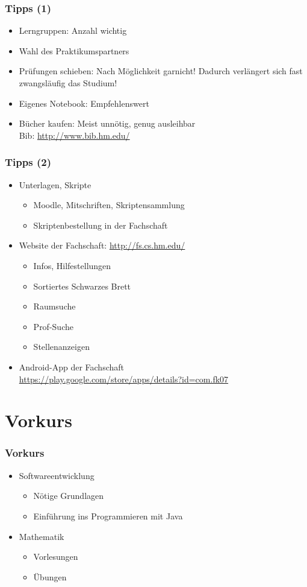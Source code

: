 \documentclass{beamer}
\begin{document}
\begin{frame}
\frametitle{Tipps (1)}
\begin{itemize}
	\item Lerngruppen: Anzahl wichtig
	\pause
	\item Wahl des Praktikumspartners
	\pause
	\item Prüfungen schieben: Nach Möglichkeit garnicht! Dadurch verlängert sich fast zwangsläufig das Studium!
	\pause
	\item Eigenes Notebook: Empfehlenswert
	\pause
	\item Bücher kaufen: Meist unnötig, genug ausleihbar\\
		\footnotesize Bib: \url{http://www.bib.hm.edu/}\small
\end{itemize}
\end{frame}


\begin{frame}
\frametitle{Tipps (2)}
\begin{itemize}
	\item Unterlagen, Skripte
		\begin{itemize}
			\item Moodle, Mitschriften, Skriptensammlung
			\item Skriptenbestellung in der Fachschaft
		\end{itemize}
	\pause
	\item Website der Fachschaft: \scriptsize\url{http://fs.cs.hm.edu/}\normalsize
		\begin{itemize}
			\item Infos, Hilfestellungen
			\item Sortiertes Schwarzes Brett
			\item Raumsuche
			\item Prof-Suche
			\item Stellenanzeigen
		\end{itemize}
	\pause
	\item Android-App der Fachschaft\\
		\scriptsize\url{https://play.google.com/store/apps/details?id=com.fk07}\normalsize
\end{itemize}
\end{frame}


\section{Vorkurs}
\begin{frame}
\frametitle{Vorkurs}
\begin{itemize}
	\item Softwareentwicklung
		\begin{itemize}
			\item Nötige Grundlagen
			\item Einführung ins Programmieren mit Java
		\end{itemize}
	\pause
	\item Mathematik
		\begin{itemize}
			\item Vorlesungen
			\item Übungen
		\end{itemize}
\end{itemize}
\end{frame}
\end{document}
